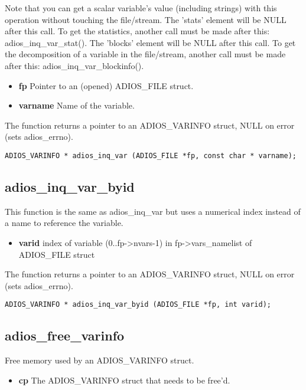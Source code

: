 Note that you can get a scalar variable's value (including strings)
with this operation without touching the file/stream.
The 'stats' element will be NULL after this call. To get the statistics, 
another call must be made after this: adios\_inq\_var\_stat().
The 'blocks' element will be NULL after this call. To get the decomposition
of a variable in the file/stream, another call must be made after this: 
adios\_inq\_var\_blockinfo().

\begin{itemize}
 \item{\bf fp} Pointer to an (opened) ADIOS\_FILE struct.
\item{\bf varname}  Name of the variable.
\end{itemize}

\noindent The function returns a pointer to an ADIOS\_VARINFO struct, NULL on error (sets adios\_errno).

\begin{lstlisting}[alsolanguage=C]
ADIOS_VARINFO * adios_inq_var (ADIOS_FILE *fp, const char * varname);

\end{lstlisting}

\subsection{adios\_inq\_var\_byid}
This function is the same as adios\_inq\_var but uses a numerical index instead of a name to reference the variable. 

\begin{itemize}
\item{\bf varid}    index of variable (0..fp->nvars-1)
in fp->vars\_namelist of ADIOS\_FILE struct
\end{itemize}

\noindent The function returns a pointer to an  ADIOS\_VARINFO struct, NULL on error (sets adios\_errno).

\begin{lstlisting}[alsolanguage=C]
ADIOS_VARINFO * adios_inq_var_byid (ADIOS_FILE *fp, int varid);
\end{lstlisting}

\subsection{adios\_free\_varinfo}
Free memory used by an ADIOS\_VARINFO struct. 
\begin{itemize}
\item{\bf cp} The ADIOS\_VARINFO struct that needs to be free'd. 
\end{itemize}

